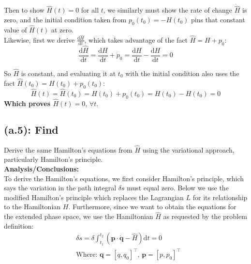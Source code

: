 \documentclass[titlepage]{article}
\begin{document}
\begin{mdframed}[linewidth=1pt, innertopmargin=10pt, innerbottommargin=10pt]
	Then to show $\hat{H}(t)=0$ for all $t$, we similarly must show the rate of change $\dot{\hat{H}}$ is zero, and the initial condition taken from $p_0(t_0)=-H(t_0)$ pins that constant value of $\hat{H}(t)$ at zero.\\
	
	Likewise, first we derive $\frac{\mathrm{d}\hat{H}}{\mathrm{d}t}$, which takes advantage of the fact $\hat{H}=H+p_0$:
	\begin{equation}
		\frac{\mathrm{d}\hat{H}}{\mathrm{d}t}=\frac{\mathrm{d}H}{\mathrm{d}t}+\dot{p}_0=\frac{\mathrm{d}H}{\mathrm{d}t}-\frac{\mathrm{d}H}{\mathrm{d}t}=0
	\end{equation}
	
	So $\hat{H}$ is constant, and evaluating it at $t_0$ with the initial condition also uses the fact $\hat{H}(t_0)=H(t_0)+p_0(t_0)$:
	\begin{equation}
		\hat{H}(t)=\hat{H}(t_0)=H(t_0)+p_0(t_0)=H(t_0)-H(t_0)=0
	\end{equation}
	\textbf{Which proves $\hat{H}(t)=0,\,\forall t$}.
\end{mdframed}

\subsection*{(a.5): Find}

Derive the same Hamilton's equations from $\hat{H}$ using the variational approach, particularly Hamilton's principle. \\

\textbf{Analysis/Conclusions:}\\

To derive the Hamilton's equations, we first consider Hamilton's principle, which says the variation in the path integral $\delta s$ must equal zero. Below we use the modified Hamilton's principle which replaces the Lagrangian $L$ for its relationship to the Hamiltonian $H$. Furthermore, since we want to obtain the equations for the extended phase space, we use the Hamiltonian $\hat{H}$ as requested by the problem definition:
\begin{equation}
	\begin{split}
		&\delta s=\delta\int_{t_1}^{t_2}\left(\boldsymbol{p}\cdot\dot{\boldsymbol{q}}-\hat{H}\right)\mathrm{d}t=0 \\
		&\text{Where: }\boldsymbol{q}=[q,q_0]^\top,\,\boldsymbol{p}=[p,p_0]^\top
	\end{split}
\end{equation}
\end{document}
